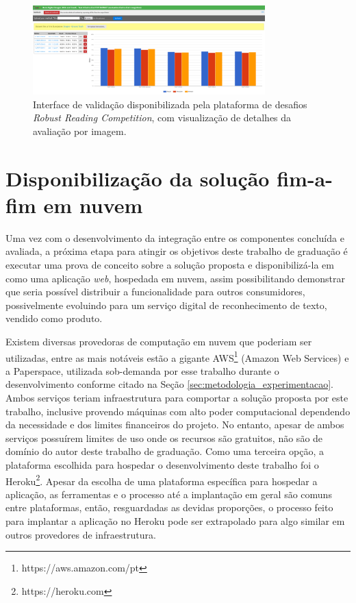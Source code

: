 \begin{figure}
    \centering
    \includegraphics[width=0.8\textwidth]{figs/metodologia-interface-validacao.png}
    \caption{Interface de validação disponibilizada pela plataforma de desafios \textit{Robust Reading Competition}, com visualização de detalhes 
    da avaliação por imagem.}
    \label{fig:methodology_validation_interface_details}
\end{figure}

\section{Disponibilização da solução fim-a-fim em nuvem}\label{sec:methodology_cloud_deploy}
Uma vez com o desenvolvimento da integração entre os componentes concluída e avaliada, a próxima etapa para atingir os objetivos deste trabalho 
de graduação é executar uma prova de conceito sobre a solução proposta e disponibilizá-la em como uma aplicação \textit{web}, hospedada em nuvem, 
assim possibilitando demonstrar que seria possível distribuir a funcionalidade para outros consumidores, possivelmente evoluindo para um serviço 
digital de reconhecimento de texto, vendido como produto.

Existem diversas provedoras de computação em nuvem que poderiam ser utilizadas, entre as mais notáveis estão a gigante AWS\footnote{https://aws.amazon.com/pt} 
(Amazon Web Services) e a Paperspace, utilizada sob-demanda por esse trabalho durante o desenvolvimento conforme citado na Seção 
\ref{sec:metodologia_experimentacao}. Ambos serviços teriam infraestrutura para comportar a solução proposta por este trabalho, inclusive provendo 
máquinas com alto poder computacional dependendo da necessidade e dos limites financeiros do projeto. No entanto, apesar de ambos serviços possuírem 
limites de uso onde os recursos são gratuitos, não são de domínio do autor deste trabalho de graduação. Como uma terceira opção, a plataforma 
escolhida para hospedar o desenvolvimento deste trabalho foi o Heroku\footnote{https://heroku.com}. Apesar da escolha de uma plataforma específica 
para hospedar a aplicação, as ferramentas e o processo até a implantação em geral são comuns entre plataformas, então, resguardadas as devidas proporções, 
o processo feito para implantar a aplicação no Heroku pode ser extrapolado para algo similar em outros provedores de infraestrutura.

